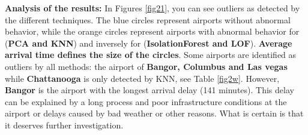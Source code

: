 \noindent\textbf{Analysis of the results:} 
In Figures \ref{fig21}, you can see outliers as detected by the different techniques. The blue circles represent airports without abnormal behavior, while the orange circles represent airports with abnormal behavior for (\textbf{PCA and KNN}) and inversely for (\textbf{IsolationForest and LOF}). \textbf{Average arrival time defines the size of the circles}. Some airports are identified as outliers by all methods: the airport of \textbf{Bangor, Columbus and Las vegas} while \textbf{Chattanooga} is only detected by KNN, see Table \ref{fig2w}. However, \textbf{Bangor} is the airport with the longest arrival delay (141 minutes). This delay can be explained by a long process and poor infrastructure conditions at the airport or delays caused by bad weather or other reasons. What is certain is that it deserves further investigation.

\afterpage{\FloatBarrier}

